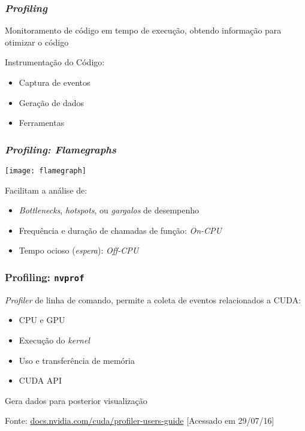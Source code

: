 \documentclass[10pt, compress]{beamer}
\begin{document}
\begin{frame}
    \frametitle{\textit{Profiling}}
    Monitoramento de código \alert{em tempo de execução},
    obtendo informação para \alert{otimizar o código}

    \alert{Instrumentação} do Código:
    \begin{itemize}
        \item Captura de \alert{eventos}
        \item Geração de \alert{dados}
        \item Ferramentas
    \end{itemize}
\end{frame}

\begin{frame}
    \frametitle{\textit{Profiling: Flamegraphs}}
    \begin{center}
        \texttt{[image: flamegraph]}
    \end{center}

    Facilitam a análise de:
    \begin{itemize}
        \item \textit{Bottlenecks}, \textit{hotspots}, ou \textit{gargalos} de desempenho
        \item Frequência e duração de \alert{chamadas de função}: \textit{On-CPU}
        \item Tempo \alert{ocioso} (\textit{espera}): \textit{Off-CPU}
    \end{itemize}
\end{frame}

\begin{frame}
    \frametitle{Profiling: \texttt{nvprof}}
    \textit{Profiler} de \alert{linha de comando},
    permite a coleta de eventos relacionados a CUDA:
    \begin{itemize}
        \item CPU e GPU
        \item Execução do \textit{kernel}
        \item Uso e transferência de memória
        \item CUDA API
    \end{itemize}

    Gera dados para \alert{posterior visualização}

    \begin{center}
        \tiny{Fonte: \url{docs.nvidia.com/cuda/profiler-users-guide} [Acessado em 29/07/16]}
    \end{center}
\end{frame}
\end{document}
